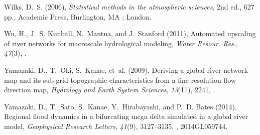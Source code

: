 \documentclass[jgrga, draft]{agutex}
\begin{document}
\begin{article}
\begin{thebibliography}{79}
Wilks, D.~S. (2006), \textit{{Statistical methods in the atmospheric
  sciences}}, 2nd ed., 627 pp., Academic Press, Burlington, MA ; London.

Wu, H., J.~S. Kimball, N.~Mantua, and J.~Stanford (2011), {Automated upscaling
  of river networks for macroscale hydrological modeling}, \textit{Water
  Resour. Res.}, \textit{47}(3), .

Yamazaki, D., T.~Oki, S.~Kanae, et~al. (2009), Deriving a global river network
  map and its sub-grid topographic characteristics from a fine-resolution flow
  direction map, \textit{Hydrology and Earth System Sciences}, \textit{13}(11),
  2241, .

Yamazaki, D., T.~Sato, S.~Kanae, Y.~Hirabayashi, and P.~D. Bates (2014),
  Regional flood dynamics in a bifurcating mega delta simulated in a global
  river model, \textit{Geophysical Research Letters}, \textit{41}(9),
  3127--3135, , 2014GL059744.

\end{thebibliography}


%
%
\end{article}


%
%
%
%
\end{document}

